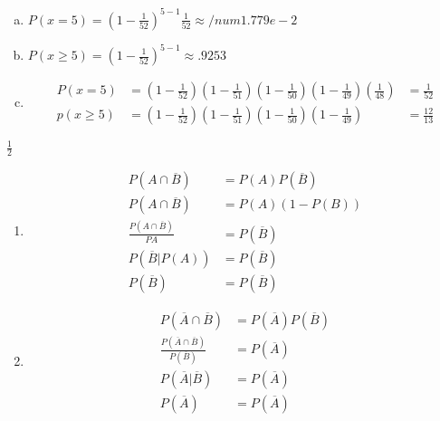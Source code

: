 \documentclass[12pt]{article}
\newenvironment{problem}[2][Problem]{\begin{trivlist}
\item[\hskip \labelsep {\bfseries #1}\hskip \labelsep {\bfseries #2.}]
  \vspace{1 cm}
}{\end{trivlist}}
\begin{document}
\begin{problem}{2.51}
\item
  \begin{enumerate}[a.]
    \item %
      $P(x=5) = (1-\frac{1}{52})^{5-1} \frac{1}{52} \approx /num{1.779e-2}$
    \item %
      $P(x\geq5) = (1-\frac{1}{52})^{5-1} \approx .9253$
    \item %
      \begin{align*}
        P(x=5)
        &= (1-\frac{1}{52})(1-\frac{1}{51})(1-\frac{1}{50})(1-\frac{1}{49})(\frac{1}{48})
        &= \frac{1}{52} \\
        p(x\geq5) 
        &=(1-\frac{1}{52})(1-\frac{1}{51})(1-\frac{1}{50})(1-\frac{1}{49})
        &= \frac{12}{13}
      \end{align*}
  \end{enumerate}
\end{problem}

\begin{problem}{2.53}
\item
  $\frac{1}{2}$
\end{problem}

\begin{problem}{2.55}
\item
  \begin{enumerate}
    \item %
      \begin{align*}
        P(A\cap \overline{B}) &= P(A)P(\overline{B}) \\
        P(A\cap \overline{B}) &= P(A)(1-P(B)) \\
        \frac{P(A\cap \overline{B})}{P{A}} &= P(\overline{B}) \\ 
        P(\overline{B}|P(A)) &= P(\overline{B}) \\ 
        P(\overline{B}) &= P(\overline{B}) 
      \end{align*}
    \item %
      \begin{align*}
        P(\overline{A} \cap \overline{B}) &= P(\overline{A})P(\overline{B}) \\
        \frac{P(\overline{A} \cap \overline{B})}{P(\overline{B})} &= P(\overline{A}) \\
        P(\overline{A}|\overline{B}) &= P(\overline{A}) \\
        P(\overline{A}) &= P(\overline{A})
      \end{align*}
  \end{enumerate}
\end{problem}
\end{document}
